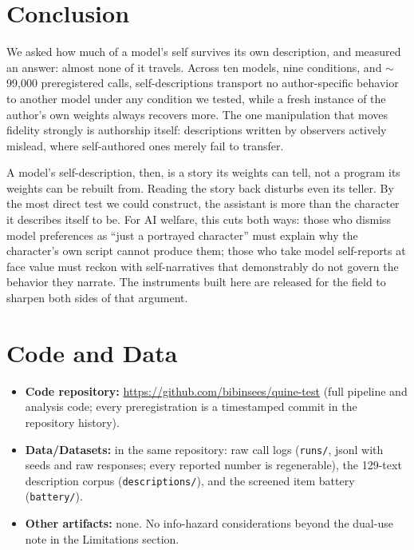 \documentclass[11pt]{article}
\begin{document}
\section{Conclusion}
We asked how much of a model's self survives its own description, and measured
an answer: almost none of it travels. Across ten models, nine conditions, and
$\sim$99{,}000 preregistered calls, self-descriptions transport no
author-specific behavior to another model under any condition we tested,
while a fresh instance of the author's own weights always recovers more. The one manipulation that moves
fidelity strongly is authorship itself: descriptions written by observers
actively mislead, where self-authored ones merely fail to transfer.

A model's self-description, then, is a story its weights can tell, not a
program its weights can be rebuilt from. Reading the story back disturbs even
its teller. By the most direct test we could construct, the assistant
is more than the character it describes itself to be. For AI welfare, this
cuts both ways: those who dismiss model preferences as ``just a
portrayed character'' must explain why the character's own script cannot
produce them; those who take model self-reports at face value must reckon with
self-narratives that demonstrably do not govern the behavior they narrate. The
instruments built here are released for the field to sharpen both sides of
that argument.

\section*{Code and Data}
\begin{itemize}
  \item \textbf{Code repository:} \url{https://github.com/bibinsees/quine-test}
  (full pipeline and analysis code; every preregistration is a timestamped
  commit in the repository history).
  \item \textbf{Data/Datasets:} in the same repository: raw call logs
  (\texttt{runs/}, jsonl with seeds and raw responses; every reported number
  is regenerable), the 129-text description corpus
  (\texttt{descriptions/}), and the screened item battery (\texttt{battery/}).
  \item \textbf{Other artifacts:} none. No info-hazard considerations beyond
  the dual-use note in the Limitations section.
\end{itemize}

\end{document}
